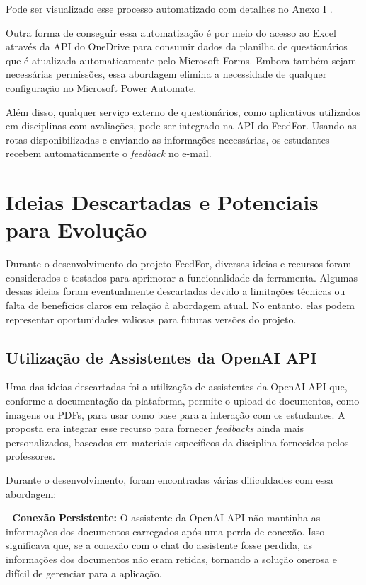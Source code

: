 Pode ser visualizado esse processo automatizado com detalhes no Anexo I .

Outra forma de conseguir essa automatização é por meio do acesso ao Excel através da API do OneDrive para consumir dados da planilha de questionários que é atualizada automaticamente pelo Microsoft Forms. Embora também sejam necessárias permissões, essa abordagem elimina a necessidade de qualquer configuração no Microsoft Power Automate.

Além disso, qualquer serviço externo de questionários, como aplicativos utilizados em disciplinas com avaliações, pode ser integrado na API do FeedFor. Usando as rotas disponibilizadas e enviando as informações necessárias, os estudantes recebem automaticamente o \textit{feedback} no e-mail.

\section{Ideias Descartadas e Potenciais para Evolução}

Durante o desenvolvimento do projeto FeedFor, diversas ideias e recursos foram considerados e testados para aprimorar a funcionalidade da ferramenta. Algumas dessas ideias foram eventualmente descartadas devido a limitações técnicas ou falta de benefícios claros em relação à abordagem atual. No entanto, elas podem representar oportunidades valiosas para futuras versões do projeto.

\subsection{Utilização de Assistentes da OpenAI API}

Uma das ideias descartadas foi a utilização de assistentes da OpenAI API que, conforme a documentação da plataforma, permite o upload de documentos, como imagens ou PDFs, para usar como base para a interação com os estudantes. A proposta era integrar esse recurso para fornecer \textit{feedbacks} ainda mais personalizados, baseados em materiais específicos da disciplina fornecidos pelos professores.

Durante o desenvolvimento, foram encontradas várias dificuldades com essa abordagem:

- \textbf{Conexão Persistente:} O assistente da OpenAI API não mantinha as informações dos documentos carregados após uma perda de conexão. Isso significava que, se a conexão com o chat do assistente fosse perdida, as informações dos documentos não eram retidas, tornando a solução onerosa e difícil de gerenciar para a aplicação.


